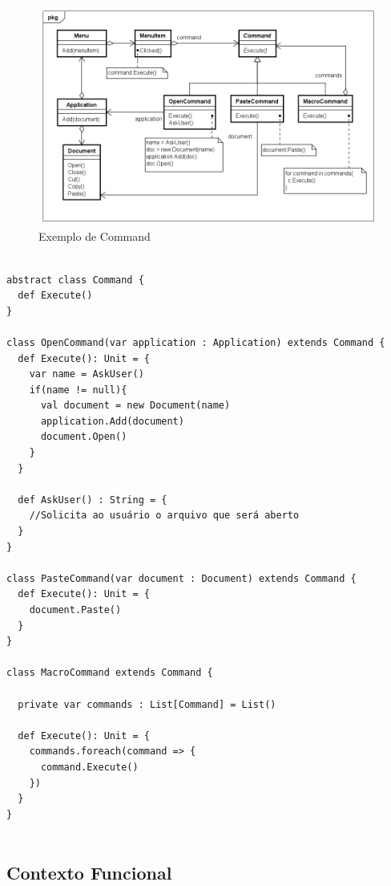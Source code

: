 \begin{figure}[htb]
	\caption{\label{command_exemplo}Exemplo de Command}
	\begin{center}
	    \includegraphics[scale=0.5]{5_padroes-contexto-funcional/5.3_comportamentais/5.3.02_command/command_exemplo.png}
	\end{center}
\end{figure}

\begin{lstlisting}[caption={Command Orientação a Objetos},label=oocommand]

abstract class Command {
  def Execute()
}

class OpenCommand(var application : Application) extends Command {
  def Execute(): Unit = {
    var name = AskUser()
    if(name != null){
      val document = new Document(name)
      application.Add(document)
      document.Open()
    }
  }

  def AskUser() : String = {
    //Solicita ao usuário o arquivo que será aberto
  }
}

class PasteCommand(var document : Document) extends Command {
  def Execute(): Unit = {
    document.Paste()
  }
}

class MacroCommand extends Command {

  private var commands : List[Command] = List()

  def Execute(): Unit = {
    commands.foreach(command => {
      command.Execute()
    })
  }
}
    
\end{lstlisting}

\subsection*{Contexto Funcional}

